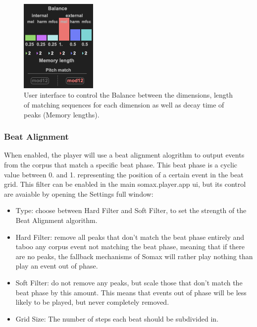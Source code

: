  \begin{figure}[h]
    \centering        
 	\includegraphics[width=0.33\textwidth]{img/atoms_ui_2-7.png}
    \caption{User interface to control the Balance between the dimensions, length of matching sequences for each dimension as well as decay time of peaks (Memory lengths).}
    \label{fig:atomui}
\end{figure}

\subsubsection{Beat Alignment}
When enabled, the player will use a beat alignment alogrithm to output events from the corpus that match a specific beat phase. This beat phase is a cyclic value between 0. and 1. representing the position of a certain event in the beat grid.
This filter can be enabled in the main somax.player.app ui, but its control are avaiable by opening the Settings full window:

\begin{itemize}
    \item Type: choose between Hard Filter and Soft Filter, to set the strength of the Beat Alignment algorithm. 

    \item Hard Filter: remove all peaks that don't match the beat phase entirely and taboo any corpus event not matching the beat phase, meaning that if there are no peaks, the fallback mechanisms of Somax will rather play nothing than play an event out of phase. 

    \item Soft Filter: do not remove any peaks, but scale those that don't match the beat phase by this amount. This means that events out of phase will be less likely to be played, but never completely removed. 

    \item Grid Size: The number of steps each beat should be subdivided in. 
\end{itemize}

